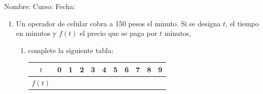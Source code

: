 \documentclass[fleqn]{article}
\newcommand{\LineaNombre}{%
\par
\vspace{\baselineskip}
Nombre:\hrulefill \; Curso: \underline{\hspace*{48pt}} \; Fecha: \underline{\hspace*{2.5cm}} \relax
\par}
\begin{document}
\LineaNombre
\begin{enumerate}
\item Un operador de celular cobra a 150 pesos el minuto. Si se designa $t$, el tiempo en minutos y $f(t)$ el precio que se paga por $t$ minutos, 
\begin{enumerate}
\item complete la siguiente tabla: \hspace*{20pt}
\begin{tabular}{|c|c|c|c|c|c|c|c|c|c|c|}
\hline 
$t$ & 0 & 1 & 2 & 3 & 4 & 5 & 6 & 7 & 8 & 9 \\ 
\hline 
$f(t)$ &  &  &  &  &  &  &  &  &  &  \\ 
\hline 
\end{tabular}


\end{enumerate}
\end{enumerate}
\end{document}
